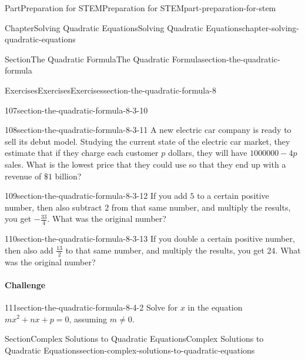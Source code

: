 \documentclass[twoside,10pt,]{book}
\numberwithin{equation}{section}
\begin{document}
\begin{partptx}{Part}{Preparation for STEM}{}{Preparation for STEM}{}{}{part-preparation-for-stem}
\begin{chapterptx}{Chapter}{Solving Quadratic Equations}{}{Solving Quadratic Equations}{}{}{chapter-solving-quadratic-equations}
\begin{sectionptx}{Section}{The Quadratic Formula}{}{The Quadratic Formula}{}{}{section-the-quadratic-formula}
\begin{exercises-subsection}{Exercises}{Exercises}{}{Exercises}{}{}{section-the-quadratic-formula-8}
\begin{divisionexercise}{107}{}{}{section-the-quadratic-formula-8-3-10}
\end{divisionexercise}%
\begin{divisionexercise}{108}{}{}{section-the-quadratic-formula-8-3-11}%
A new electric car company is ready to sell its debut model. Studying the current state of the electric car market, they estimate that if they charge each customer \(p\) dollars, they will have \({1000000-4p}\) sales. What is the lowest price that they could use so that they end up with a revenue of \({\$1}\) billion?%
\end{divisionexercise}%
\begin{divisionexercise}{109}{}{}{section-the-quadratic-formula-8-3-12}%
If you add \({5}\) to a certain positive number, then also subtract \(2\) from that same number, and multiply the results, you get \({-{\frac{33}{4}}}\text{.}\) What was the original number?%
\end{divisionexercise}%
\begin{divisionexercise}{110}{}{}{section-the-quadratic-formula-8-3-13}%
If you double a certain positive number, then also add  \({{\frac{13}{2}}}\) to that same number, and multiply the results, you get \({24}\text{.}\) What was the original number?%
\end{divisionexercise}%
\paragraph{Challenge}\hypertarget{section-the-quadratic-formula-8-4}{}
\begin{divisionexercise}{111}{}{}{section-the-quadratic-formula-8-4-2}%
Solve for \(x\) in the equation \(mx^{2}+nx+p=0\text{,}\) assuming \(m\neq0\text{.}\)%
\end{divisionexercise}%
\end{exercises-subsection}
\end{sectionptx}
%
%
\typeout{************************************************}
\typeout{************************************************}
%
\begin{sectionptx}{Section}{Complex Solutions to Quadratic Equations}{}{Complex Solutions to Quadratic Equations}{}{}{section-complex-solutions-to-quadratic-equations}
\begin{introduction}{}%


\end{introduction}
\end{sectionptx}
\end{chapterptx}
\end{partptx}
\end{document}
